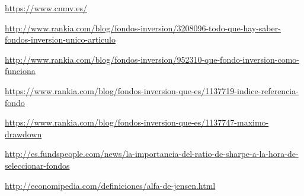 \documentclass[12pt, a4paper]{book}
\begin{document}
\begin{thebibliography}{10}
	
	
	\bibitem[CNMV]{}
	\newline
	\href{https://www.cnmv.es/}{https://www.cnmv.es/}
	
	\bibitem[Rankia]{}
	\newline
	\href{http://www.rankia.com/blog/fondos-inversion/3208096-todo-que-hay-saber-fondos-inversion-unico-articulo}{http://www.rankia.com/blog/fondos-inversion/3208096-todo-que-hay-saber-fondos-inversion-unico-articulo}
	
	\bibitem[Rankia]{}
	\newline
	\href{http://www.rankia.com/blog/fondos-inversion/952310-que-fondo-inversion-como-funciona}{http://www.rankia.com/blog/fondos-inversion/952310-que-fondo-inversion-como-funciona}
	
	\bibitem[Rankia]{}
	\newline
	\href{https://www.rankia.com/blog/fondos-inversion-que-es/1137719-indice-referencia-fondo}{https://www.rankia.com/blog/fondos-inversion-que-es/1137719-indice-referencia-fondo}
	
	\bibitem[Rankia]{}
	\newline
	\href{https://www.rankia.com/blog/fondos-inversion-que-es/1137747-maximo-drawdown}{https://www.rankia.com/blog/fondos-inversion-que-es/1137747-maximo-drawdown}
	
	\newline
	\href{http://es.fundspeople.com/news/la-importancia-del-ratio-de-sharpe-a-la-hora-de-seleccionar-fondos}{http://es.fundspeople.com/news/la-importancia-del-ratio-de-sharpe-a-la-hora-de-seleccionar-fondos}
	
	\bibitem[Economipedia]{}
	\newline
	\href{http://economipedia.com/definiciones/alfa-de-jensen.html}{http://economipedia.com/definiciones/alfa-de-jensen.html}
	

\end{thebibliography}
\end{document}
